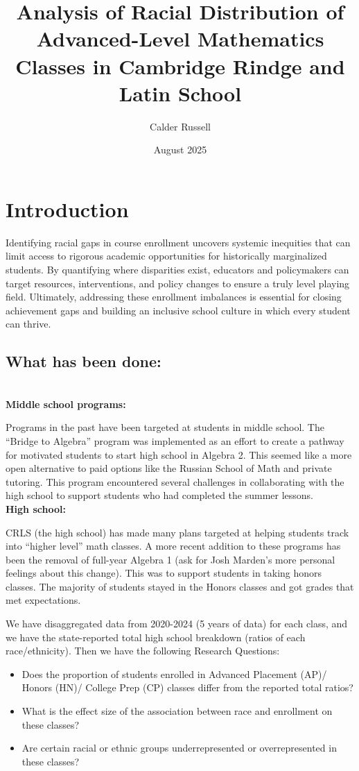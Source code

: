 \documentclass{article}
\title{Analysis of Racial Distribution of Advanced-Level Mathematics Classes in  Cambridge Rindge and Latin School}
\author{Calder Russell}
\date{August 2025}
\begin{document}
\maketitle

\section{Introduction}
Identifying racial gaps in course enrollment uncovers systemic inequities that can limit access to rigorous academic opportunities for historically marginalized students. By quantifying where disparities exist, educators and policymakers can target resources, interventions, and policy changes to ensure a truly level playing field. Ultimately, addressing these enrollment imbalances is essential for closing achievement gaps and building an inclusive school culture in which every student can thrive.
\subsection{What has been done:}\\
\textbf{Middle school programs:} 

Programs in the past have been targeted at students in middle school. The “Bridge to Algebra” program was implemented as an effort to create a pathway for motivated students to start high school in Algebra 2. This seemed like a more open alternative to paid options like the Russian School of Math and private tutoring. This program encountered several challenges in collaborating with the high school to support students who had completed the summer lessons.\\
\textbf{High school:}

CRLS (the high school) has made many plans targeted at helping students track into “higher level” math classes. A more recent addition to these programs has been the removal of full-year Algebra 1 (ask for Josh Marden’s more personal feelings about this change). This was to support students in taking honors classes. The majority of students stayed in the Honors classes and got grades that met expectations.

We have disaggregated data from 2020-2024 (5 years of data) for each class, and we have the state-reported total high school breakdown (ratios of each race/ethnicity). Then we have the following Research Questions:
\begin{itemize}
    \item Does the proportion of students enrolled in Advanced Placement (AP)/ Honors (HN)/ College Prep (CP) classes differ from the reported total ratios?
    \item What is the effect size of the association between race and enrollment on these classes?
    \item Are certain racial or ethnic groups underrepresented or overrepresented in these classes?
\end{itemize}
\end{document}
